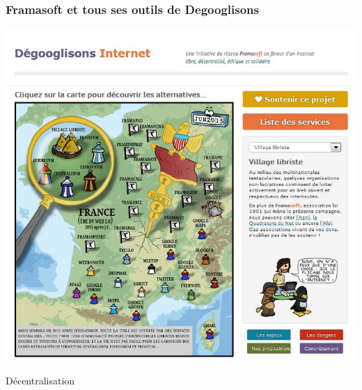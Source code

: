 \documentclass{beamer}
\begin{document}
\begin{frame}
\begin{center}
\frametitle{Framasoft et tous ses outils de Degooglisons}
\includegraphics[scale=0.6] {./images/framasoft_degogglisons.jpg}
\end{center}
\end{frame}

\begin{frame}
\begin{center}
\Huge {Décentralisation}
\end{center}
\end{frame}
\end{document}
